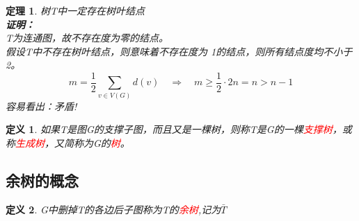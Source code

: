 \documentclass[11pt,a4paper,openany]{book}
\newcommand{\song}{\CJKfamily{song}}
\newtheorem{theorem}{\textbf{定理}}[section]
\newtheorem{defination}{\textbf{定义}}[section]
\begin{document}
\begin{theorem}
树T中一定存在树叶结点\\
{\song
\textbf{证明：}\\
T为连通图，故不存在度为零的结点。\\
假设T中不存在树叶结点，则意味着不存在度为
1的结点，则所有结点度均不小于2。
$$ m=\frac{1}{2}\sum_{v\in V(G)} d(v)\quad \Rightarrow \quad m \geq \frac{1}{2}\cdot 2n=n > n-1$$
容易看出：矛盾!\\
}
\end{theorem}
\begin{defination}
如果T是图G的支撑子图，而且又是一棵树，则称T是G的一棵\textcolor{red}{支撑树}，或称\textcolor{red}{生成树}，又简称为G的\textcolor{red}{树}。
\end{defination}
\subsection{余树的概念}
\begin{defination}
G中删掉T的各边后子图称为T的\textcolor{red}{余树},记为$\bar{T}$
\end{defination}
\end{document}
